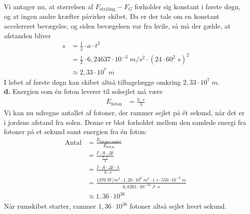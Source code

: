 \documentclass{report}
\begin{document}
Vi antager nu, at størrelsen af $F _{\text{stråling} }-F_G$ forholder sig konstant i første døgn, og at ingen andre kræfter påvirker skibet. 
Da er der tale om en konstant accelereret bevægelse, og siden bevægelsen var fra hvile, så må der gælde, at afstanden bliver 
\begin{equation*}
\begin{split}
  s&=\frac{1}{2} \cdot a \cdot t^2\\
  &=\frac{1}{2} \cdot 6,24637 \cdot 10^{-3} \;\unit{m/s^2} \cdot \left(24 \cdot 60^2 \;\unit{s} \right)^2 \\
  &\approx 2,33 \cdot 10^7\;\unit{m} 
\end{split}
\end{equation*}
I løbet af første døgn kan skibet altså tilbagelægge omkring $2,33 \cdot 10^7 \;\unit{m} $.\\[1ex]
\textbf{d.}
Energien som én foton leverer til solsejlet må være
\begin{equation*}
\begin{split}
  E_{\text{foton} }&=\frac{h \cdot c}{\lambda }
\end{split}
\end{equation*}
Vi kan nu udregne antallet af fotoner, der rammer sejlet på ét sekund, når det er i jordens afstand fra solen. 
Denne er blot forholdet mellem den samlede energi fra fotoner på et sekund samt energien fra én foton:
\begin{equation*}
\begin{split}
  \text{Antal} &=\frac{E_{\text{fotoner samlet} }}{E_{\text{foton} }}\\
  &=\frac{I \cdot A \cdot \Delta t}{\frac{h \cdot c}{\lambda }}\\
  &=\frac{I \cdot A \cdot \Delta t \cdot \lambda }{h \cdot c}\\
  &=\frac{1370 \;\unit{W/m^2} \cdot 1,20 \cdot 10^6 \;\unit{m^2} \cdot 1 \;\unit{s} \cdot 550 \cdot 10 ^{-9}\;\unit{m} }{6,6261 \cdot 10 ^{-34} \;\unit{J \cdot s} }\\
  &\approx 1,36 \cdot 10 ^{36} 
\end{split}
\end{equation*}
Når rumskibet starter, rammer $1,36 \cdot 10 ^{36}$ fotoner altså sejlet hvert sekund. 
\end{document}
